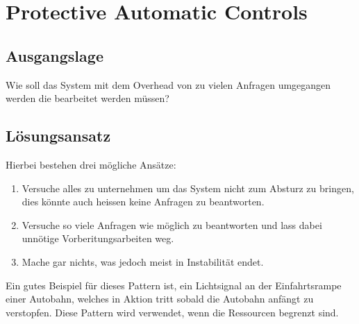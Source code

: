 \section{Protective Automatic Controls}

\subsection{Ausgangslage}

Wie soll das System mit dem Overhead von zu vielen Anfragen umgegangen werden die bearbeitet werden müssen?

\subsection{Lösungsansatz}

Hierbei bestehen drei mögliche Ansätze:
\begin{enumerate}
	\item Versuche alles zu unternehmen um das System nicht zum Absturz zu bringen, dies könnte auch heissen keine Anfragen zu beantworten.
	\item Versuche so viele Anfragen wie möglich zu beantworten und lass dabei unnötige Vorberitungsarbeiten weg.
	\item Mache gar nichts, was jedoch meist in Instabilität endet.
\end{enumerate}

Ein gutes Beispiel für dieses Pattern ist, ein Lichtsignal an der Einfahrtsrampe einer Autobahn, welches in Aktion tritt sobald die Autobahn anfängt zu verstopfen. Diese Pattern wird verwendet, wenn die Ressourcen begrenzt sind.

